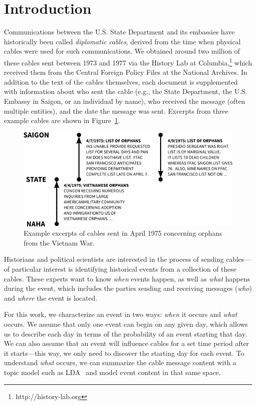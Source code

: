 \section{Introduction}

Communications between the U.S. State Department and its embassies have historically been called \emph{diplomatic cables}, derived from the time when physical cables were used for such communications.
We obtained around two million of these cables sent between 1973 and 1977 via the History Lab at Columbia,\footnote{http://history-lab.org} which received them from the Central Foreign Policy Files at the National Archives.  In addition to the text of the cables themselves, each document is supplemented with information about who sent the cable (e.g., the State Department, the U.S. Embassy in Saigon, or an individual by name), who received the message (often multiple entities), and the date the message was sent.
Excerpts from three example cables are shown in Figure~\ref{fig:cables_example}.

\begin{figure}[ht]
\centering
\includegraphics[width=\textwidth]{fig/cables_orphan_example.png}
\caption{Example excerpts of cables sent in April 1975 concerning orphans from the Vietnam War.}
\label{fig:cables_example}
\end{figure}

Historians and political scientists are interested in the process of sending cables---of particular interest is identifying historical events from a collection of these cables.  These experts want to know \emph{when} events happen, as well as \emph{what} happens during the event, which includes the parties sending and receiving messages (\emph{who}) and \emph{where} the event is located. 

For this work, we characterize an event in two ways: \emph{when} it occurs and \emph{what} occurs.  We assume that only one event can begin on any given day, which allows us to describe each day in terms of the probability of an event starting that day.  We can also assume that an event will influence cables for a set time period after it starts---this way, we only need to discover the starting day for each event.  
To understand \emph{what} occurs, we can summarize the cable message content with a topic model such as LDA~\citep{Blei:2003} and model event content in that same space.


